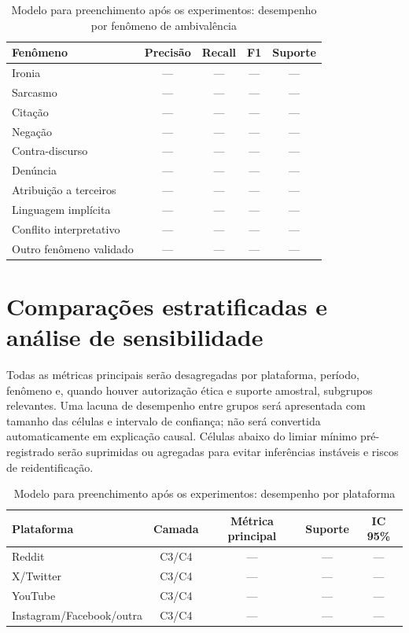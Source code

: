 \begin{table}[htbp]
\centering
\caption{Modelo para preenchimento após os experimentos: desempenho por fenômeno de ambivalência}
\label{tab:resultados-fenomeno-c4}
\begin{tabular}{|p{}|c|c|c|c|}
\hline
\textbf{Fenômeno} & \textbf{Precisão} & \textbf{Recall} & \textbf{F1} & \textbf{Suporte} \\
\hline
Ironia & --- & --- & --- & --- \\
\hline
Sarcasmo & --- & --- & --- & --- \\
\hline
Citação & --- & --- & --- & --- \\
\hline
Negação & --- & --- & --- & --- \\
\hline
Contra-discurso & --- & --- & --- & --- \\
\hline
Denúncia & --- & --- & --- & --- \\
\hline
Atribuição a terceiros & --- & --- & --- & --- \\
\hline
Linguagem implícita & --- & --- & --- & --- \\
\hline
Conflito interpretativo & --- & --- & --- & --- \\
\hline
Outro fenômeno validado & --- & --- & --- & --- \\
\hline
\end{tabular}
\end{table}

\section{Comparações estratificadas e análise de sensibilidade}

Todas as métricas principais serão desagregadas por plataforma, período, fenômeno e, quando houver autorização ética e suporte amostral, subgrupos relevantes. Uma lacuna de desempenho entre grupos será apresentada com tamanho das células e intervalo de confiança; não será convertida automaticamente em explicação causal. Células abaixo do limiar mínimo pré-registrado serão suprimidas ou agregadas para evitar inferências instáveis e riscos de reidentificação.

\begin{table}[htbp]
\centering
\caption{Modelo para preenchimento após os experimentos: desempenho por plataforma}
\label{tab:resultados-plataforma}
\begin{tabular}{|l|c|c|c|c|}
\hline
\textbf{Plataforma} & \textbf{Camada} & \textbf{Métrica principal} & \textbf{Suporte} & \textbf{IC 95\%} \\
\hline
Reddit & C3/C4 & --- & --- & --- \\
\hline
X/Twitter & C3/C4 & --- & --- & --- \\
\hline
YouTube & C3/C4 & --- & --- & --- \\
\hline
Instagram/Facebook/outra & C3/C4 & --- & --- & --- \\
\hline
\end{tabular}
\end{table}

